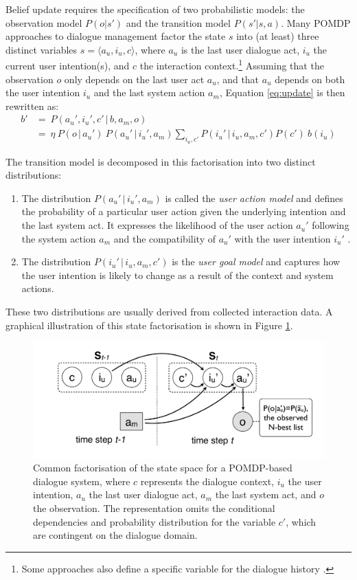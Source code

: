 Belief update requires the specification of two probabilistic models: the observation model $P(o|s')$ and the transition model $P(s'|s,a)$. Many POMDP approaches to dialogue management factor the state $s$ into (at least) three distinct variables $s = \langle a_u, i_u, c \rangle$, where $a_u$ is the last user dialogue act, $i_u$ the current user intention(s), and $c$ the interaction context.\footnote{Some approaches also define a specific variable for the dialogue history \citep{Young:2010}.}   Assuming that the observation $o$ only depends on the last user act $a_u$, and that $a_u$ depends on both the user intention $i_u$ and the last system action $a_m$, Equation \eqref{eq:update} is then rewritten as:
\begin{align}
b' & = \ P(a_u', i_u', c' \, | \, b, a_m,o)\\
& = \ \eta \ P(o \, | \, a_u') \ P(a_u' \, | \, i_u', a_m) \sum_{i_u, c'} P(i_u' \, | \, i_u,a_m, c') P(c') \ b(i_u) \label{eq:update2}
\end{align}

The transition model is decomposed in this factorisation into two distinct distributions: \begin{enumerate}
\item  The distribution $P(a_u' \, | \, i_u', a_m)$ is called the \textit{user action model} and defines the probability of a particular user action given the underlying intention and the last system act.  It expresses the likelihood of the user action $a_u'$ following the system action $a_m$ and the compatibility of $a_u'$ with the user intention $i_u'$ \citep{Young:2010}.
\item The distribution $P(i_u' \, | \, i_u, a_m, c')$ is the \textit{user goal model} and captures how the user intention is likely to change as a result of the context and system actions.  
\end{enumerate}

These two distributions are usually derived from collected interaction data. A graphical illustration of this state factorisation is shown in Figure \ref{fig:pomdp2}. 

\begin{figure}[h]
\centering
\includegraphics[scale=0.28]{imgs/POMDP2.pdf}
\caption{Common factorisation of the state space for a POMDP-based dialogue system, where $c$ represents the dialogue context, $i_u$ the user intention, $a_u$ the last user dialogue act, $a_m$ the last system act, and $o$ the observation. The representation omits the conditional dependencies and probability distribution for the variable $c'$, which are contingent on the dialogue domain.}
\label{fig:pomdp2}
\end{figure}

